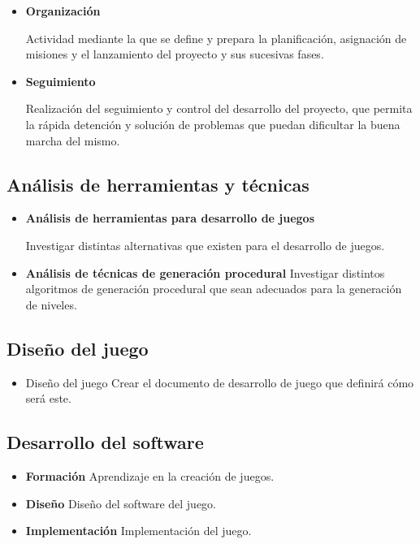 \begin{itemize}
	\item \textbf{Organización}

	Actividad mediante la que se define y prepara la planificación, asignación de misiones y el lanzamiento del proyecto y sus sucesivas fases.
	\item \textbf{Seguimiento}

	Realización del seguimiento y control del desarrollo del proyecto, que permita la rápida detención y solución de problemas que puedan dificultar la buena marcha del mismo.
\end{itemize}

\subsection{Análisis de herramientas y técnicas}

\begin{itemize}
	\item \textbf{Análisis de herramientas para desarrollo de juegos}
	
	Investigar distintas alternativas que existen para el desarrollo de juegos.

	\item \textbf{Análisis de técnicas de generación procedural}
	Investigar distintos algoritmos de generación procedural que sean adecuados para la generación de niveles.
\end{itemize}

\subsection{Diseño del juego}

\begin{itemize}
	\item Diseño del juego
	Crear el documento de desarrollo de juego que definirá cómo será este.
\end{itemize}

\subsection{Desarrollo del software}

\begin{itemize}
	\item \textbf{Formación}
	Aprendizaje en la creación de juegos.
	\item \textbf{Diseño}
	Diseño del software del juego.
	\item \textbf{Implementación}
	Implementación del juego.
\end{itemize}


